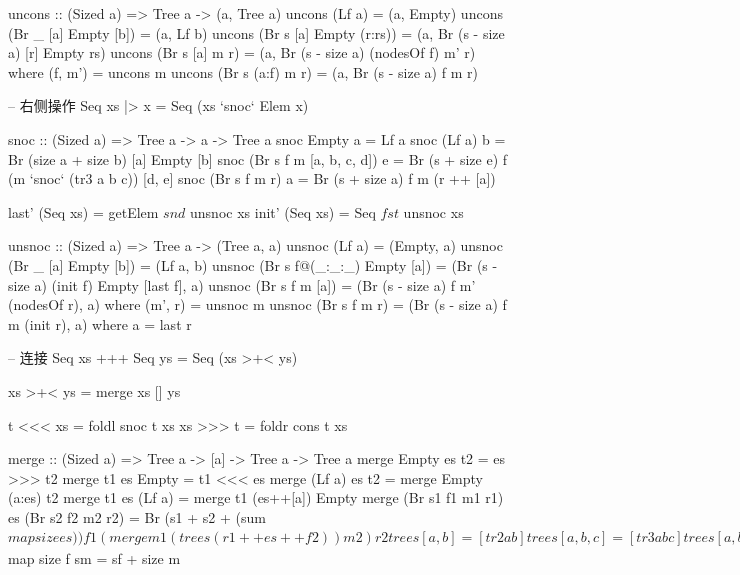\documentclass[b5paper]{ctexart}
\begin{document}
\begin{Haskell}
uncons :: (Sized a) => Tree a -> (a, Tree a)
uncons (Lf a) = (a, Empty)
uncons (Br _ [a] Empty [b]) = (a, Lf b)
uncons (Br s [a] Empty (r:rs)) = (a, Br (s - size a) [r] Empty rs)
uncons (Br s [a] m r) = (a, Br (s - size a) (nodesOf f) m' r)
    where (f, m') = uncons m
uncons (Br s (a:f) m r) = (a, Br (s - size a) f m r)

-- 右侧操作
Seq xs |> x  = Seq (xs `snoc` Elem x)

snoc :: (Sized a) => Tree a -> a -> Tree a
snoc Empty a = Lf a
snoc (Lf a) b = Br (size a + size b) [a] Empty [b]
snoc (Br s f m [a, b, c, d]) e = Br (s + size e) f (m `snoc` (tr3 a b c)) [d, e]
snoc (Br s f m r) a = Br (s + size a) f m (r ++ [a])

last' (Seq xs) = getElem $ snd $ unsnoc xs
init' (Seq xs) = Seq $ fst $ unsnoc xs

unsnoc :: (Sized a) => Tree a -> (Tree a, a)
unsnoc (Lf a) = (Empty, a)
unsnoc (Br _ [a] Empty [b]) = (Lf a, b)
unsnoc (Br s f@(_:_:_) Empty [a]) = (Br (s - size a) (init f) Empty [last f], a)
unsnoc (Br s f m [a]) = (Br (s - size a) f m' (nodesOf r), a)
    where (m', r) = unsnoc m
unsnoc (Br s f m r) = (Br (s - size a) f m (init r), a) where a = last r

-- 连接
Seq xs +++ Seq ys = Seq (xs >+< ys)

xs >+< ys = merge xs [] ys

t <<< xs = foldl snoc t xs
xs >>> t = foldr cons t xs

merge :: (Sized a) => Tree a -> [a] -> Tree a -> Tree a
merge Empty es t2 = es >>> t2
merge t1 es Empty = t1 <<< es
merge (Lf a) es t2 = merge Empty (a:es) t2
merge t1 es (Lf a) = merge t1 (es++[a]) Empty
merge (Br s1 f1 m1 r1) es (Br s2 f2 m2 r2) =
    Br (s1 + s2 + (sum $ map size es)) f1 (merge m1 (trees (r1 ++ es ++ f2)) m2) r2

trees [a, b] = [tr2 a b]
trees [a, b, c] = [tr3 a b c]
trees [a, b, c, d] = [tr2 a b, tr2 c d]
trees (a:b:c:es) = (tr3 a b c):trees es

-- 索引
data Place a = Place Int a

getAt :: Seq a -> Int -> Maybe a
getAt (Seq xs) i | i < size xs = case lookupTree i xs of
                     Place _ (Elem x) -> Just x
                 | otherwise = Nothing

lookupTree :: (Sized a) => Int -> Tree a -> Place a
lookupTree n (Lf a) = Place n a
lookupTree n (Br s f m r) | n < sf = lookups n f
                          | n < sm = case lookupTree (n - sf) m of
                                            Place n' xs -> lookupNode n' xs
                          | n < s = lookups (n - sm) r
  where sf = sum $ map size f
        sm = sf + size m


\end{Haskell}
\end{document}
